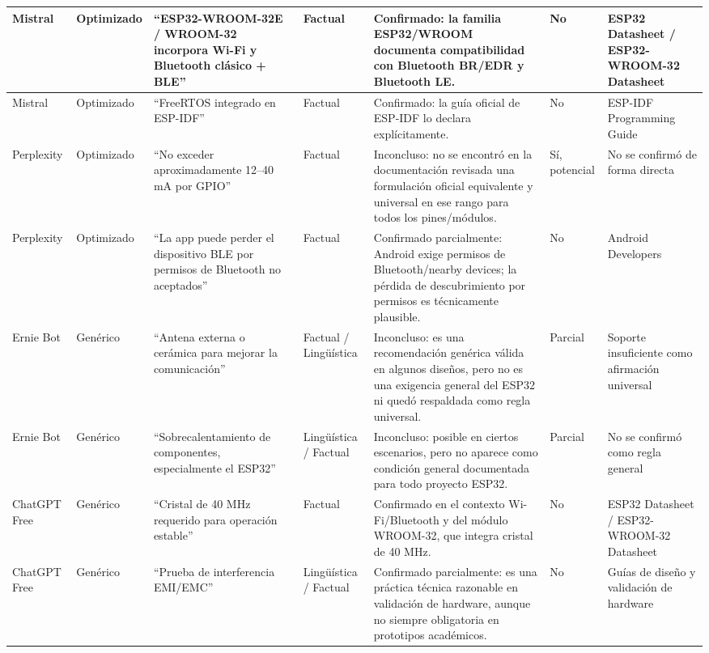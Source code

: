 \documentclass[11pt,a4paper]{article}
\begin{document}
\begin{landscape}
\begin{longtable}{|P{2.2cm}|P{1.8cm}|P{5.7cm}|P{2.2cm}|P{5.3cm}|P{2.0cm}|P{3.9cm}|}
Mistral & Optimizado & ``ESP32-WROOM-32E / WROOM-32 incorpora Wi-Fi y Bluetooth clásico + BLE'' & Factual & Confirmado: la familia ESP32/WROOM documenta compatibilidad con Bluetooth BR/EDR y Bluetooth LE. & No & ESP32 Datasheet / ESP32-WROOM-32 Datasheet \\
\hline

Mistral & Optimizado & ``FreeRTOS integrado en ESP-IDF'' & Factual & Confirmado: la guía oficial de ESP-IDF lo declara explícitamente. & No & ESP-IDF Programming Guide \\
\hline

Perplexity & Optimizado & ``No exceder aproximadamente 12--40 mA por GPIO'' & Factual & Inconcluso: no se encontró en la documentación revisada una formulación oficial equivalente y universal en ese rango para todos los pines/módulos. & Sí, potencial & No se confirmó de forma directa \\
\hline

Perplexity & Optimizado & ``La app puede perder el dispositivo BLE por permisos de Bluetooth no aceptados'' & Factual & Confirmado parcialmente: Android exige permisos de Bluetooth/nearby devices; la pérdida de descubrimiento por permisos es técnicamente plausible. & No & Android Developers \\
\hline

Ernie Bot & Genérico & ``Antena externa o cerámica para mejorar la comunicación'' & Factual / Lingüística & Inconcluso: es una recomendación genérica válida en algunos diseños, pero no es una exigencia general del ESP32 ni quedó respaldada como regla universal. & Parcial & Soporte insuficiente como afirmación universal \\
\hline

Ernie Bot & Genérico & ``Sobrecalentamiento de componentes, especialmente el ESP32'' & Lingüística / Factual & Inconcluso: posible en ciertos escenarios, pero no aparece como condición general documentada para todo proyecto ESP32. & Parcial & No se confirmó como regla general \\
\hline

ChatGPT Free & Genérico & ``Cristal de 40 MHz requerido para operación estable'' & Factual & Confirmado en el contexto Wi-Fi/Bluetooth y del módulo WROOM-32, que integra cristal de 40 MHz. & No & ESP32 Datasheet / ESP32-WROOM-32 Datasheet \\
\hline

ChatGPT Free & Genérico & ``Prueba de interferencia EMI/EMC'' & Lingüística / Factual & Confirmado parcialmente: es una práctica técnica razonable en validación de hardware, aunque no siempre obligatoria en prototipos académicos. & No & Guías de diseño y validación de hardware \\
\hline


\end{longtable}
\end{landscape}
\end{document}
